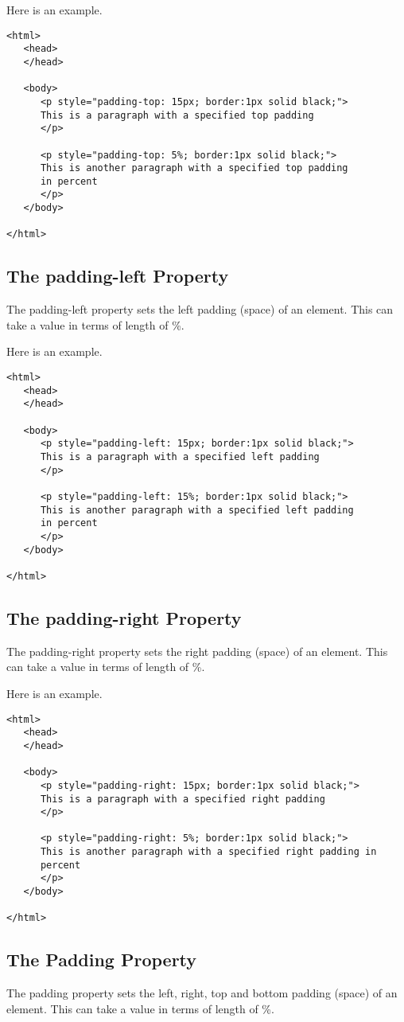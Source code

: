 \documentclass[a4paper,oneside]{book}
\numberwithin{equation}{chapter}
\begin{document}
Here is an example.
\begin{verbatim}
<html>
   <head>
   </head>
   
   <body>
      <p style="padding-top: 15px; border:1px solid black;">
      This is a paragraph with a specified top padding
      </p>
      
      <p style="padding-top: 5%; border:1px solid black;">
      This is another paragraph with a specified top padding 
      in percent
      </p>
   </body>
   
</html> 
\end{verbatim}
\subsection{The padding-left Property}
The padding-left property sets the left padding (space) of an element. This can take a value in terms of length of \%.

Here is an example. 
\begin{verbatim}
<html>
   <head>
   </head>
   
   <body>
      <p style="padding-left: 15px; border:1px solid black;">
      This is a paragraph with a specified left padding
      </p>
      
      <p style="padding-left: 15%; border:1px solid black;">
      This is another paragraph with a specified left padding 
      in percent
      </p>
   </body>
   
</html>
\end{verbatim}
\subsection{The padding-right Property}
The padding-right property sets the right padding (space) of an element. This can take a value in terms of length of \%.

Here is an example.
\begin{verbatim}
<html>
   <head>
   </head>
   
   <body>
      <p style="padding-right: 15px; border:1px solid black;">
      This is a paragraph with a specified right padding
      </p>
      
      <p style="padding-right: 5%; border:1px solid black;">
      This is another paragraph with a specified right padding in 
      percent
      </p>
   </body>
   
</html> 
\end{verbatim}
\subsection{The Padding Property}
The padding property sets the left, right, top and bottom padding (space) of an element. This can take a value in terms of length of \%.
\end{document}
